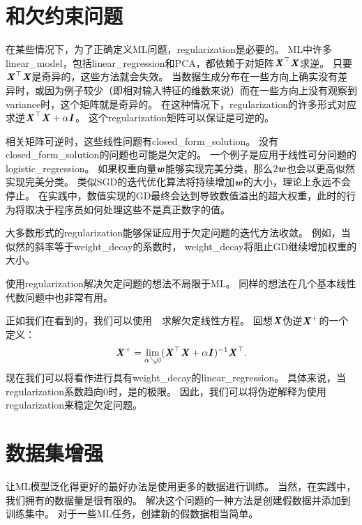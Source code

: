 \section{和欠约束问题}
\label{sec:regularization_and_under_constrained_problems}
在某些情况下，为了正确定义\gls{ML}问题，\gls{regularization}是必要的。
\gls{ML}中许多\gls{linear_model}，包括\gls{linear_regression}和PCA，都依赖于对矩阵$\boldsymbol{\mathit{X}}^\top\boldsymbol{\mathit{X}}$求逆。
只要$\boldsymbol{\mathit{X}}^\top\boldsymbol{\mathit{X}}$是奇异的，这些方法就会失效。
当数据生成分布在一些方向上确实没有差异时，或因为例子较少（即相对输入特征的维数来说）而在一些方向上没有观察到\gls{variance}时，这个矩阵就是奇异的。
在这种情况下，\gls{regularization}的许多形式对应求逆$\boldsymbol{\mathit{X}}^\top\boldsymbol{\mathit{X}} + \alpha \boldsymbol{\mathit{I}}$。
这个\gls{regularization}矩阵可以保证是可逆的。

相关矩阵可逆时，这些线性问题有\gls{closed_form_solution}。
没有\gls{closed_form_solution}的问题也可能是欠定的。
一个例子是应用于线性可分问题的\gls{logistic_regression}。
如果权重向量$\boldsymbol{\mathit{w}}$能够实现完美分类，那么$2 \boldsymbol{\mathit{w}}$也会以更高似然实现完美分类。
类似\gls{SGD}的迭代优化算法将持续增加$\boldsymbol{\mathit{w}}$的大小，理论上永远不会停止。
在实践中，数值实现的\gls{GD}最终会达到导致数值溢出的超大权重，此时的行为将取决于程序员如何处理这些不是真正数字的值。

大多数形式的\gls{regularization}能够保证应用于欠定问题的迭代方法收敛。
例如，当似然的斜率等于\gls{weight_decay}的系数时， \gls{weight_decay}将阻止\gls{GD}继续增加权重的大小。

使用\gls{regularization}解决欠定问题的想法不局限于\gls{ML}。
同样的想法在几个基本线性代数问题中也非常有用。


正如我们在看到的，我们可以使用~~求解欠定线性方程。 
回想$\boldsymbol{\mathit{X}}$伪逆$\boldsymbol{\mathit{X}}^+$的一个定义：
\begin{align} 
\label{eq:729pseudo}
 \boldsymbol{\mathit{X}}^+ = \lim_{\alpha \searrow 0} (\boldsymbol{\mathit{X}}^\top \boldsymbol{\mathit{X}} + \alpha \boldsymbol{\mathit{I}})^{-1}\boldsymbol{\mathit{X}}^\top.
\end{align}
现在我们可以将看作进行具有\gls{weight_decay}的\gls{linear_regression}。
具体来说，当\gls{regularization}系数趋向0时，是的极限。
因此，我们可以将伪逆解释为使用\gls{regularization}来稳定欠定问题。


\section{数据集增强}
\label{sec:dataset_augmentation_chap7}
让\gls{ML}模型泛化得更好的最好办法是使用更多的数据进行训练。
当然，在实践中，我们拥有的数据量是很有限的。
解决这个问题的一种方法是创建假数据并添加到训练集中。
对于一些\gls{ML}任务，创建新的假数据相当简单。

